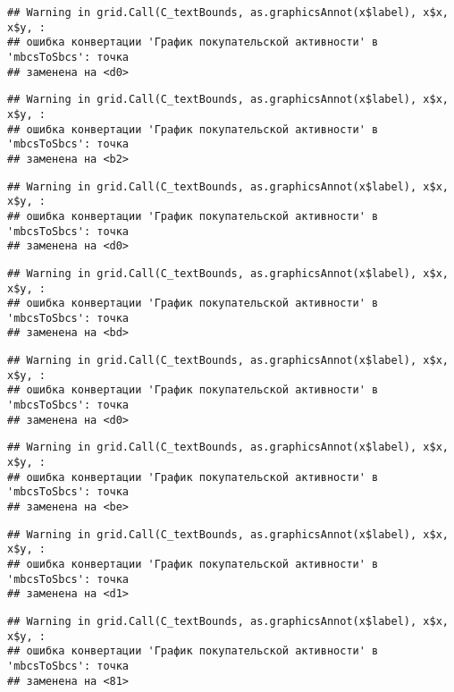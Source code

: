\documentclass[
]{article}
\begin{document}
\begin{verbatim}
## Warning in grid.Call(C_textBounds, as.graphicsAnnot(x$label), x$x, x$y, :
## ошибка конвертации 'График покупательской активности' в 'mbcsToSbcs': точка
## заменена на <d0>
\end{verbatim}

\begin{verbatim}
## Warning in grid.Call(C_textBounds, as.graphicsAnnot(x$label), x$x, x$y, :
## ошибка конвертации 'График покупательской активности' в 'mbcsToSbcs': точка
## заменена на <b2>
\end{verbatim}

\begin{verbatim}
## Warning in grid.Call(C_textBounds, as.graphicsAnnot(x$label), x$x, x$y, :
## ошибка конвертации 'График покупательской активности' в 'mbcsToSbcs': точка
## заменена на <d0>
\end{verbatim}

\begin{verbatim}
## Warning in grid.Call(C_textBounds, as.graphicsAnnot(x$label), x$x, x$y, :
## ошибка конвертации 'График покупательской активности' в 'mbcsToSbcs': точка
## заменена на <bd>
\end{verbatim}

\begin{verbatim}
## Warning in grid.Call(C_textBounds, as.graphicsAnnot(x$label), x$x, x$y, :
## ошибка конвертации 'График покупательской активности' в 'mbcsToSbcs': точка
## заменена на <d0>
\end{verbatim}

\begin{verbatim}
## Warning in grid.Call(C_textBounds, as.graphicsAnnot(x$label), x$x, x$y, :
## ошибка конвертации 'График покупательской активности' в 'mbcsToSbcs': точка
## заменена на <be>
\end{verbatim}

\begin{verbatim}
## Warning in grid.Call(C_textBounds, as.graphicsAnnot(x$label), x$x, x$y, :
## ошибка конвертации 'График покупательской активности' в 'mbcsToSbcs': точка
## заменена на <d1>
\end{verbatim}

\begin{verbatim}
## Warning in grid.Call(C_textBounds, as.graphicsAnnot(x$label), x$x, x$y, :
## ошибка конвертации 'График покупательской активности' в 'mbcsToSbcs': точка
## заменена на <81>
\end{verbatim}
\end{document}
